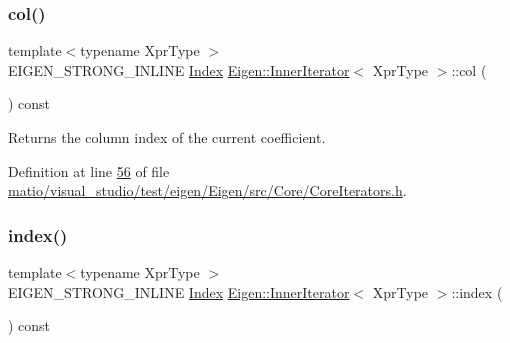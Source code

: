 \subsubsection{\texorpdfstring{col()}{col()}\hspace{0.1cm}{\footnotesize\ttfamily [2/2]}}
{\footnotesize\ttfamily template$<$typename Xpr\+Type $>$ \\
E\+I\+G\+E\+N\+\_\+\+S\+T\+R\+O\+N\+G\+\_\+\+I\+N\+L\+I\+NE \hyperlink{namespace_eigen_a62e77e0933482dafde8fe197d9a2cfde}{Index} \hyperlink{class_eigen_1_1_inner_iterator}{Eigen\+::\+Inner\+Iterator}$<$ Xpr\+Type $>$\+::col (\begin{DoxyParamCaption}{ }\end{DoxyParamCaption}) const\hspace{0.3cm}{\ttfamily [inline]}}

\begin{DoxyReturn}{Returns}
the column index of the current coefficient. 
\end{DoxyReturn}


Definition at line \hyperlink{matio_2visual__studio_2test_2eigen_2_eigen_2src_2_core_2_core_iterators_8h_source_l00056}{56} of file \hyperlink{matio_2visual__studio_2test_2eigen_2_eigen_2src_2_core_2_core_iterators_8h_source}{matio/visual\+\_\+studio/test/eigen/\+Eigen/src/\+Core/\+Core\+Iterators.\+h}.

\mbox{\label{class_eigen_1_1_inner_iterator_ac9e0e40b8aceb192a0e1c7d656148760}} 
\subsubsection{\texorpdfstring{index()}{index()}\hspace{0.1cm}{\footnotesize\ttfamily [1/2]}}
{\footnotesize\ttfamily template$<$typename Xpr\+Type $>$ \\
E\+I\+G\+E\+N\+\_\+\+S\+T\+R\+O\+N\+G\+\_\+\+I\+N\+L\+I\+NE \hyperlink{namespace_eigen_a62e77e0933482dafde8fe197d9a2cfde}{Index} \hyperlink{class_eigen_1_1_inner_iterator}{Eigen\+::\+Inner\+Iterator}$<$ Xpr\+Type $>$\+::index (\begin{DoxyParamCaption}{ }\end{DoxyParamCaption}) const\hspace{0.3cm}{\ttfamily [inline]}}


